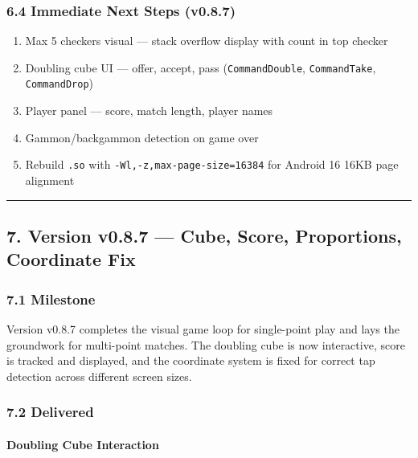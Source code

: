 \documentclass[11pt,a4paper]{article}
\providecommand{\tightlist}{\setlength{\itemsep}{2pt}\setlength{\parskip}{0pt}}
\begin{document}
\subsubsection{6.4 Immediate Next Steps (v0.8.7)}\label{next-steps-v086}

\begin{enumerate}
\def\labelenumi{\arabic{enumi}.}
\tightlist
\item
  Max 5 checkers visual — stack overflow display with count in top checker
\item
  Doubling cube UI — offer, accept, pass (\texttt{CommandDouble},
  \texttt{CommandTake}, \texttt{CommandDrop})
\item
  Player panel — score, match length, player names
\item
  Gammon/backgammon detection on game over
\item
  Rebuild \texttt{.so} with \texttt{-Wl,-z,max-page-size=16384} for
  Android 16 16KB page alignment
\end{enumerate}

\begin{center}\rule{0.5\linewidth}{0.5pt}\end{center}

\subsection{7. Version v0.8.7 --- Cube, Score, Proportions, Coordinate Fix}\label{version-v087}

\subsubsection{7.1 Milestone}\label{milestone-v087}

Version v0.8.7 completes the visual game loop for single-point play and
lays the groundwork for multi-point matches. The doubling cube is now
interactive, score is tracked and displayed, and the coordinate system
is fixed for correct tap detection across different screen sizes.

\subsubsection{7.2 Delivered}\label{delivered-v087}

\paragraph{Doubling Cube Interaction}
\end{document}
